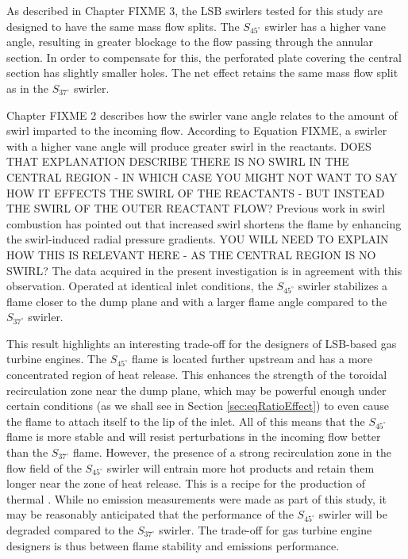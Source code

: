As described in Chapter FIXME 3, the LSB swirlers tested for this study are designed to have the same mass flow splits.
The \(S_{45^\circ}\) swirler has a higher vane angle, resulting in greater blockage to the flow passing through the annular section.
In order to compensate for this, the perforated plate covering the central section has slightly smaller holes.
The net effect retains the same mass flow split as in the \(S_{37^\circ}\) swirler.

Chapter FIXME 2 describes how the swirler vane angle relates to the amount of swirl imparted to the incoming flow.
According to Equation FIXME, a swirler with a higher vane angle will produce greater swirl in the reactants. DOES THAT EXPLANATION DESCRIBE THERE IS NO SWIRL IN THE CENTRAL REGION - IN WHICH CASE YOU MIGHT NOT WANT TO SAY HOW IT EFFECTS THE SWIRL OF THE REACTANTS - BUT INSTEAD THE SWIRL OF THE OUTER REACTANT FLOW?
Previous work in swirl combustion\cite{1992-chan,1986-starner} has pointed out that increased swirl shortens the flame by enhancing the swirl-induced radial pressure gradients. YOU WILL NEED TO EXPLAIN HOW THIS IS RELEVANT HERE - AS THE CENTRAL REGION IS NO SWIRL?
The data acquired in the present investigation is in agreement with this observation.
Operated at identical inlet conditions, the \(S_{45^\circ}\) swirler stabilizes a flame closer to the dump plane and with a larger flame angle compared to the \(S_{37^\circ}\) swirler.

This result highlights an interesting trade-off for the designers of LSB-based gas turbine engines.
The \(S_{45^\circ}\) flame is located further upstream and has a more concentrated region of heat release.
This enhances the strength of the toroidal recirculation zone near the dump plane, which may be powerful enough under certain conditions (as we shall see in  Section \ref{sec:eqRatioEffect}) to even cause the flame to attach itself to the lip of the inlet.
All of this means that the \(S_{45^\circ}\) flame is more stable and will resist perturbations in the incoming flow better than the \(S_{37^\circ}\) flame.
However, the presence of a strong recirculation zone in the flow field of the \(S_{45^\circ}\) swirler will entrain more hot products and retain them longer near the zone of heat release.
This is a recipe for the production of thermal .
While no emission measurements were made as part of this study, it may be reasonably anticipated that the  performance of the \(S_{45^\circ}\) swirler will be degraded compared to the \(S_{37^\circ}\) swirler.
The trade-off for gas turbine engine designers is thus between flame stability and emissions performance.


